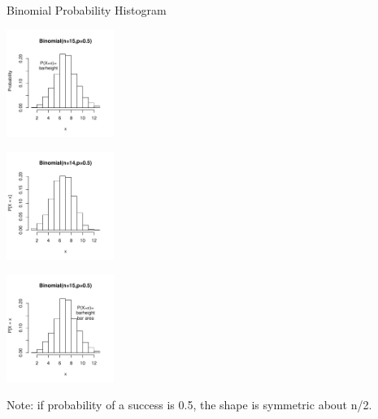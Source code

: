 \documentclass[14pt]{beamer}\usepackage[]{graphicx}\usepackage[]{color}
\begin{document}
\begin{frame}[fragile]{Binomial Probability Histogram}

\begin{minipage}[ht]{3.5cm}


\includegraphics[width=3.5cm]{figure/LBL7a-1} 


\end{minipage}  %
\begin{minipage}[ht]{3.5cm}


\includegraphics[width=3.5cm]{figure/LBL7b-1} 


\end{minipage}

\begin{minipage}[ht]{3.5cm}


\includegraphics[width=3.5cm]{figure/LBL7c-1} 


\end{minipage}  %
\begin{minipage}[ht]{4cm}

{\scriptsize{
Note: if probability of a success is 0.5, the shape is symmetric about n/2.
}}
\end{minipage}

\end{frame}
\end{document}
